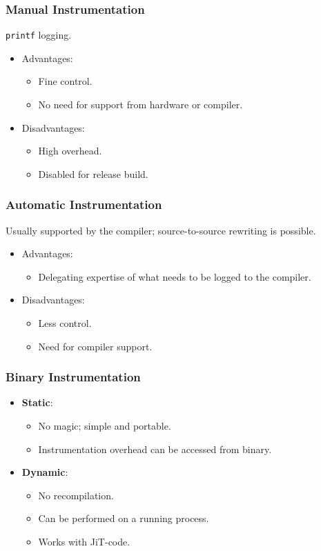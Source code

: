 \documentclass[11pt]{article}
\begin{document}
\subsubsection{Manual Instrumentation}
\texttt{printf} logging.
\begin{itemize}
  \item Advantages:
    \begin{itemize}
      \item Fine control.
      \item No need for support from hardware or compiler.
    \end{itemize}
  \item Disadvantages:
    \begin{itemize}
      \item High overhead.
      \item Disabled for release build.
    \end{itemize}
\end{itemize}

\subsubsection{Automatic Instrumentation}
Usually supported by the compiler; source-to-source rewriting is possible.
\begin{itemize}
  \item Advantages:
    \begin{itemize}
      \item Delegating expertise of what needs to be logged to the compiler.
    \end{itemize}
  \item Disadvantages:
    \begin{itemize}
      \item Less control.
      \item Need for compiler support.
    \end{itemize}
\end{itemize}

\subsubsection{Binary Instrumentation}
\begin{itemize}
  \item \textbf{Static}:
    \begin{itemize}
      \item No magic; simple and portable.
      \item Instrumentation overhead can be accessed from binary.
    \end{itemize}
  \item \textbf{Dynamic}:
    \begin{itemize}
      \item No recompilation.
      \item Can be performed on a running process.
      \item Works with JiT-code.
    \end{itemize}
\end{itemize}
\end{document}
